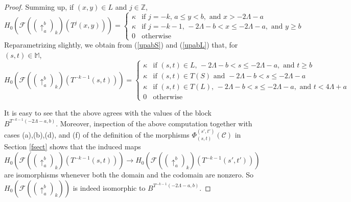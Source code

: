 \documentclass[11pt]{amsart}
\theoremstyle{definition}
\theoremstyle{remark}
\numberwithin{equation}{section}
\def\Z{\mathbb{Z}}
\begin{document}
\begin{proof}
Summing up, if $(x,y)\in L$ and $j\in \Z$, \begin{equation}\label{upabL} H_0\left(\mathcal{F}\left(\left(\uparrow_{a}^{b}\right)_k\right)(T^j(x,y)) \right)=\left\{\begin{array}{ll}\kappa & \mbox{if }j=-k,\, a\leq y<b,\mbox{ and }x>-2\Lambda-a \\ \kappa & \mbox{if } j=-k-1 ,\,-2\Lambda-b<x\leq -2\Lambda-a,\mbox{ and }y\geq b\\ 0 & \mbox{otherwise}\end{array}\right.   \end{equation}  Reparametrizing slightly, we obtain from (\ref{upabS}) and (\ref{upabL}) that, for $(s,t)\in\mathbb{M}$, \[
H_0\left(\mathcal{F}\left(\left(\uparrow_{a}^{b}\right)_k\right)(T^{-k-1}(s,t))\right)=\left\{\begin{array}{ll}\kappa & \mbox{if }(s,t)\in L,\,-2\Lambda-b<s\leq -2\Lambda-a,\mbox{ and }t\geq b  \\ \kappa & \mbox{if }(s,t)\in T(S)\mbox{ and }-2\Lambda-b<s\leq -2\Lambda-a \\ \kappa & \mbox{if }(s,t)\in T(L),\,-2\Lambda-b<s\leq -2\Lambda-a, \mbox{ and }t<4\Lambda+a \\ 0 & \mbox{otherwise}\end{array} \right. \]

It is easy to see that the above agrees with the values of the block $B^{T^{-k-1}(-2\Lambda-a,b)}$.  Moreover, inspection of the above computation together with cases (a),(b),(d), and (f) of the definition of the morphisms $\Phi_{(s,t)}^{(s',t')}(\mathcal{C})$ in Section \ref{fsect} shows that the induced maps
 $H_0\left(\mathcal{F}\left(\left(\uparrow_{a}^{b}\right)_k\right)(T^{-k-1}(s,t))\right)\to H_0\left(\mathcal{F}\left(\left(\uparrow_{a}^{b}\right)_k\right)(T^{-k-1}(s',t'))\right)$ 
 are isomorphisms whenever both the domain and the codomain are nonzero.  So
  $H_0\left(\mathcal{F}\left(\left(\uparrow_{a}^{b}\right)_k\right)\right)$ is indeed isomorphic to $B^{T^{-k-1}(-2\Lambda-a,b)}$.


\end{proof}
\end{document}
